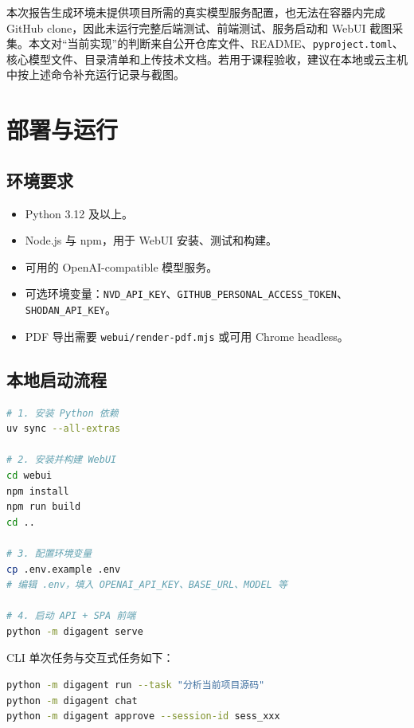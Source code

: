 \documentclass[UTF8,zihao=-4,a4paper,fontset=none]{ctexart}
\newcommand{\code}[1]{\texttt{\footnotesize #1}}
\begin{document}
本次报告生成环境未提供项目所需的真实模型服务配置，也无法在容器内完成 GitHub clone，因此未运行完整后端测试、前端测试、服务启动和 WebUI 截图采集。本文对“当前实现”的判断来自公开仓库文件、README、\code{pyproject.toml}、核心模型文件、目录清单和上传技术文档。若用于课程验收，建议在本地或云主机中按上述命令补充运行记录与截图。

\section{部署与运行}

\subsection{环境要求}

\begin{itemize}
  \item Python 3.12 及以上。
  \item Node.js 与 npm，用于 WebUI 安装、测试和构建。
  \item 可用的 OpenAI-compatible 模型服务。
  \item 可选环境变量：\code{NVD\_API\_KEY}、\code{GITHUB\_PERSONAL\_ACCESS\_TOKEN}、\code{SHODAN\_API\_KEY}。
  \item PDF 导出需要 \code{webui/render-pdf.mjs} 或可用 Chrome headless。
\end{itemize}

\subsection{本地启动流程}

\begin{lstlisting}[language=bash,caption={本地启动流程}]
# 1. 安装 Python 依赖
uv sync --all-extras

# 2. 安装并构建 WebUI
cd webui
npm install
npm run build
cd ..

# 3. 配置环境变量
cp .env.example .env
# 编辑 .env，填入 OPENAI_API_KEY、BASE_URL、MODEL 等

# 4. 启动 API + SPA 前端
python -m digagent serve
\end{lstlisting}

CLI 单次任务与交互式任务如下：

\begin{lstlisting}[language=bash]
python -m digagent run --task "分析当前项目源码"
python -m digagent chat
python -m digagent approve --session-id sess_xxx
\end{lstlisting}
\end{document}
